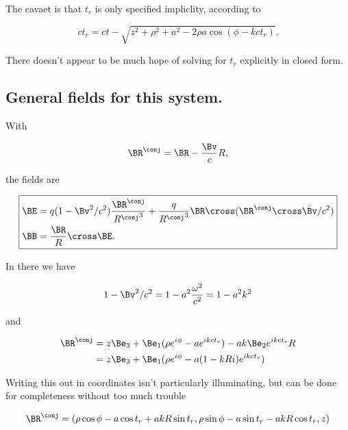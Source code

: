 The cavaet is that $t_r$ is only specified impliclity, according to

\begin{equation}\label{eqn:relativisticElectrodynamicsExamReflection:520}
\boxed{
c t_r = c t - \sqrt{z^2 + \rho^2 + a^2 - 2 \rho a \cos( \phi - k c t_r ) }.
}
\end{equation}

There doesn't appear to be much hope of solving for $t_r$ explicitly in closed form.

\subsection{General fields for this system.}

With 

\begin{equation}\label{eqn:relativisticElectrodynamicsExamReflection:540}
\BR^\conj = \BR - \frac{\Bv}{c} R,
\end{equation}

the fields are

\begin{equation}\label{eqn:relativisticElectrodynamicsExamReflection:560}
\boxed{
\begin{aligned}
\BE &= q (1 - \Bv^2/c^2) \frac{\BR^\conj}{{R^\conj}^3} + \frac{q}{{R^\conj}^3} \BR \cross (\BR^\conj \cross \dot{\Bv}/c^2) \\
\BB &= \frac{\BR}{R} \cross \BE.
\end{aligned}
}
\end{equation}

In there we have

\begin{equation}\label{eqn:relativisticElectrodynamicsExamReflection:580}
1 - \Bv^2/c^2 = 1 - a^2 \frac{\omega^2}{c^2} = 1 - a^2 k^2
\end{equation}

and

\begin{align*}
\BR^\conj 
&= 
z \Be_3 + \Be_1 (\rho e^{i \phi} - a e^{i k c t_r} )
-
a k \Be_2 e^{i k c t_r} R \\
&= 
z \Be_3 + \Be_1 (\rho e^{i \phi} - a (1 - k R i) e^{i k c t_r} )
\end{align*}

Writing this out in coordinates isn't particularly illuminating, but can be done for completeness without too much trouble

\begin{equation}\label{eqn:relativisticElectrodynamicsExamReflection:600}
\BR^\conj = 
( \rho \cos\phi - a \cos t_r + a k R \sin t_r,
  \rho \sin\phi - a \sin t_r - a k R \cos t_r,
  z )
\end{equation}

